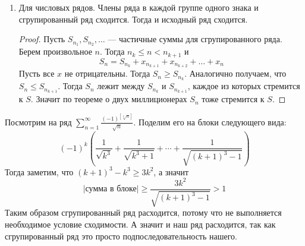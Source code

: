\begin{enumerate}
  \item Для числовых рядов. Члены ряда в каждой группе одного знака и сгрупированный ряд сходится. Тогда и исходный ряд сходится.
  \begin{proof}
    Пусть $S_{n_1}, S_{n_2}, \dotsc$ --- частичные суммы для сгрупированного ряда. Берем произвольное $n$. Тогда $n_k \leq n < n_{k + 1}$ и
    \begin{equation*}
      S_n = S_{n_k} + x_{n_{k + 1}} + x_{n_{k + 2}} + \dotsc + x_n
    \end{equation*}
    Пусть все $x$ не отрицательны. Тогда $S_n \geq S_{n_k}$. Аналогично получаем, что $S_n \leq S_{n_{k + 1}}$. Тогда $S_n$ лежит между $S_{n_k}$ и $S_{n_{k + 1}}$, каждое из которых стремится к $S$. Значит по теореме о двух миллиционерах $S_n$ тоже стремится к $S$.
  \end{proof}
\end{enumerate}

\begin{example}
  Посмотрим на ряд $\sum\limits_{n = 1}^{\infty} \frac{(-1)^{[\sqrt[3]{n}]}}{\sqrt{n}}$. Поделим его на блоки следующего вида:
  \begin{equation*}
    (-1)^k \left(
      \frac{1}{\sqrt{k^3}} + \frac{1}{\sqrt{k^3 + 1}} + \dotsb + \frac{1}{\sqrt{(k + 1)^3 - 1}}
    \right)
  \end{equation*}
  Тогда заметим, что $(k + 1)^3 - k^3 \geq 3k^2$, а значит
  \begin{equation*}
    |\text{сумма в блоке}|
    \geq
    \frac{3k^2}{\sqrt{(k + 1)^3 - 1}} > 1
  \end{equation*}
  Таким образом сгрупированный ряд расходится, потому что не выполняется необходимое условие сходимости. А значит и наш ряд расходится, так как сгрупированный ряд это просто подпоследовательность нашего.
\end{example}
